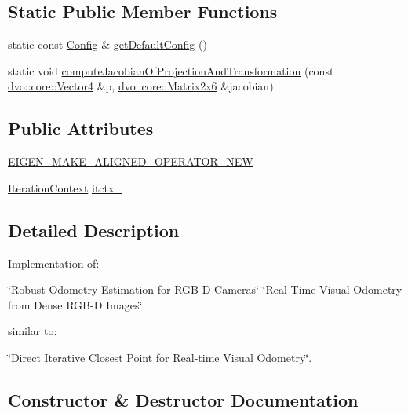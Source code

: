 \subsection*{Static Public Member Functions}
\begin{DoxyCompactItemize}
\item 
static const \mbox{\hyperlink{structdvo_1_1_dense_tracker_1_1_config}{Config}} \& \mbox{\hyperlink{classdvo_1_1_dense_tracker_a81b87df428095d10a86c996d6f2fc900}{get\+Default\+Config}} ()
\item 
static void \mbox{\hyperlink{classdvo_1_1_dense_tracker_a534e6aaf24e6526de76e97b3a73a234c}{compute\+Jacobian\+Of\+Projection\+And\+Transformation}} (const \mbox{\hyperlink{namespacedvo_1_1core_a71fd2291c4d15b2a797ec3a0959d2b6a}{dvo\+::core\+::\+Vector4}} \&p, \mbox{\hyperlink{namespacedvo_1_1core_ac6a9bb149a44f85a33be52a701abfac8}{dvo\+::core\+::\+Matrix2x6}} \&jacobian)
\end{DoxyCompactItemize}
\subsection*{Public Attributes}
\begin{DoxyCompactItemize}
\item 
\mbox{\hyperlink{classdvo_1_1_dense_tracker_a5ee11c294ea7be93c11f6b7ab202b236}{E\+I\+G\+E\+N\+\_\+\+M\+A\+K\+E\+\_\+\+A\+L\+I\+G\+N\+E\+D\+\_\+\+O\+P\+E\+R\+A\+T\+O\+R\+\_\+\+N\+EW}}
\item 
\mbox{\hyperlink{structdvo_1_1_dense_tracker_1_1_iteration_context}{Iteration\+Context}} \mbox{\hyperlink{classdvo_1_1_dense_tracker_a8ce3afa309ab0f9063da110f18797ec7}{itctx\+\_\+}}
\end{DoxyCompactItemize}


\subsection{Detailed Description}
Implementation of\+:

\char`\"{}\+Robust Odometry Estimation for R\+G\+B-\/\+D Cameras\char`\"{} \char`\"{}\+Real-\/\+Time Visual Odometry from Dense R\+G\+B-\/\+D Images\char`\"{}

similar to\+:

\char`\"{}\+Direct Iterative Closest Point for Real-\/time Visual Odometry\char`\"{}. 

\subsection{Constructor \& Destructor Documentation}
\mbox{\label{classdvo_1_1_dense_tracker_a48f7e802113a0e8840cea6cae0ef580e}} 
